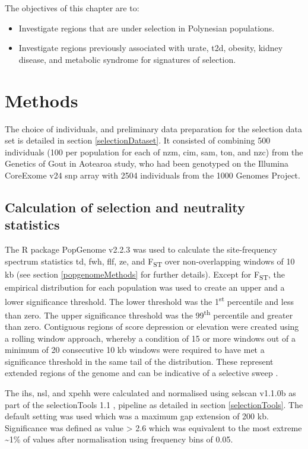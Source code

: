 \documentclass[]{report}
\providecommand{\tightlist}{%
  \setlength{\itemsep}{0pt}\setlength{\parskip}{0pt}}
\begin{document}
The objectives of this chapter are to:

\begin{itemize}
\tightlist
\item
  Investigate regions that are under selection in Polynesian
  populations.
\item
  Investigate regions previously associated with urate, \gls{t2d},
  obesity, kidney disease, and metabolic syndrome for signatures of
  selection.
\end{itemize}

\section{Methods}\label{methods}

The choice of individuals, and preliminary data preparation for the
selection data set is detailed in section \ref{selectionDataset}. It
consisted of combining 500 individuals (100 per population for each of
\gls{nzm}, \gls{cim}, \gls{sam}, \gls{ton}, and \gls{nzc}) from the
Genetics of Gout in Aotearoa study, who had been genotyped on the
Illumina CoreExome v24 \gls{snp} array with 2504 individuals from the
1000 Genomes Project.

\subsection{Calculation of selection and neutrality
statistics}\label{calcSel}

The R package PopGenome v2.2.3 \citep{Pfeifer2014} was used to calculate
the site-frequency spectrum statistics \gls{td}, \gls{fwh}, \gls{flf},
\gls{ze}, and F\textsubscript{ST} over non-overlapping windows of 10 kb
(see section \ref{popgenomeMethods} for further details). Except for
F\textsubscript{ST}, the empirical distribution for each population was
used to create an upper and a lower significance threshold. The lower
threshold was the 1\textsuperscript{st} percentile and less than zero.
The upper significance threshold was the 99\textsuperscript{th}
percentile and greater than zero. Contiguous regions of score depression
or elevation were created using a rolling window approach, whereby a
condition of 15 or more windows out of a minimum of 20 consecutive 10 kb
windows were required to have met a significance threshold in the same
tail of the distribution. These represent extended regions of the genome
and can be indicative of a selective sweep \citep{Carlson2005}.

The \gls{ihs}, \gls{nsl}, and \gls{xpehh} were calculated and normalised
using selscan v1.1.0b \citep{Szpiech2014} as part of the selectionTools
1.1 \citep{Cadzow2014}, pipeline as detailed in section
\ref{selectionTools}. The default setting was used which was a maximum
gap extension of 200 kb. Significance was defined as
\textbar{}value\textbar{} \textgreater{} 2.6 which was equivalent to the
most extreme \textasciitilde{}1\% of values after normalisation using
frequency bins of 0.05.
\end{document}
